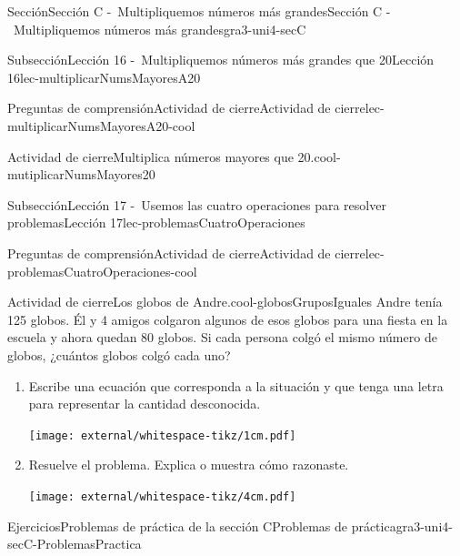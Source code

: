 \begin{sectionptx}{Sección}{Sección C -~Multipliquemos números más grandes}{}{Sección C -~Multipliquemos números más grandes}{}{}{gra3-uni4-secC}
\begin{subsectionptx}{Subsección}{Lección 16 -~Multipliquemos números más grandes que 20}{}{Lección 16}{}{}{lec-multiplicarNumsMayoresA20}
\begin{reading-questions-subsubsection}{Preguntas de comprensión}{Actividad de cierre}{}{Actividad de cierre}{}{}{lec-multiplicarNumsMayoresA20-cool}
\begin{project}{Actividad de cierre}{Multiplica números mayores que 20.}{cool-mutiplicarNumsMayores20}
\end{project}%
\end{reading-questions-subsubsection}
\end{subsectionptx}
%
%
\typeout{************************************************}
\typeout{************************************************}
%
\begin{subsectionptx}{Subsección}{Lección 17 -~Usemos las cuatro operaciones para resolver problemas}{}{Lección 17}{}{}{lec-problemasCuatroOperaciones}
%
%
\typeout{************************************************}
\typeout{************************************************}
%
\begin{reading-questions-subsubsection-numberless}{Preguntas de comprensión}{Actividad de cierre}{}{Actividad de cierre}{}{}{lec-problemasCuatroOperaciones-cool}
\begin{project}{Actividad de cierre}{Los globos de Andre.}{cool-globosGruposIguales}%
Andre tenía 125 globos. Él y 4 amigos colgaron algunos de esos globos para una fiesta en la escuela y ahora quedan 80 globos. Si cada persona colgó el mismo número de globos, ¿cuántos globos colgó cada uno?%
%
\begin{enumerate}[label={(\alph*)}]
\item{}Escribe una ecuación que corresponda a la situación y que tenga una letra para representar la cantidad desconocida.%
\begin{image}{0}{1}{0}{}%
\texttt{[image: external/whitespace-tikz/1cm.pdf]}
\end{image}%
\item{}Resuelve el problema. Explica o muestra cómo razonaste.%
\begin{image}{0}{1}{0}{}%
\texttt{[image: external/whitespace-tikz/4cm.pdf]}
\end{image}%
\end{enumerate}
\end{project}%
\end{reading-questions-subsubsection-numberless}
\end{subsectionptx}
%
%
\typeout{************************************************}
\typeout{************************************************}
%
\begin{exercises-subsection}{Ejercicios}{Problemas de práctica de la sección C}{}{Problemas de práctica}{}{}{gra3-uni4-secC-ProblemasPractica}

\end{exercises-subsection}
\end{sectionptx}
